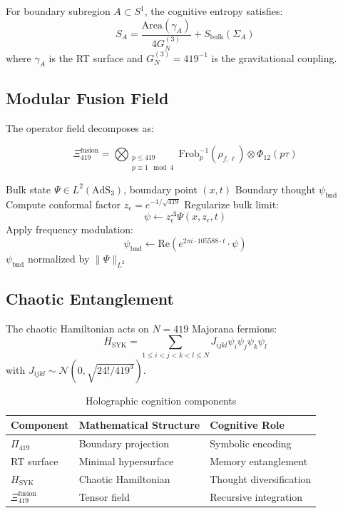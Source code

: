 \documentclass[12pt]{article}
\begin{document}
\begin{theorem}
For boundary subregion $A\subset S^1$, the cognitive entropy satisfies:
\[
S_A = \frac{\text{Area}(\gamma_A)}{4G_N^{(3)}} + S_{\text{bulk}}(\Sigma_A)
\]
where $\gamma_A$ is the RT surface and $G_N^{(3)}=419^{-1}$ is the gravitational coupling.
\end{theorem}

\subsection{Modular Fusion Field}
The operator field decomposes as:

\begin{equation}
\Xi_{419}^{\text{fusion}} = \bigotimes_{\substack{p\leq419 \\ p\equiv1\mod4}} \text{Frob}_p^{-1}(\rho_{f,\ell})\otimes\Phi_{12}(p\tau)
\end{equation}

\begin{algorithm}[H]
\caption{AdS-CFT Cognitive Projection}
\begin{algorithmic}[1]
\Require Bulk state $\Psi\in L^2(\text{AdS}_3)$, boundary point $(x,t)$
\Ensure Boundary thought $\psi_{\text{bnd}}$
\State Compute conformal factor $z_{\epsilon}=e^{-1/\sqrt{419}}$
\State Regularize bulk limit:
\[
\psi \gets z_{\epsilon}^{\Delta}\Psi(x,z_{\epsilon},t)
\]
\State Apply frequency modulation:
\[
\psi_{\text{bnd}} \gets \text{Re}(e^{2\pi i\cdot105588\cdot t}\cdot\psi)
\]
\State \Return $\psi_{\text{bnd}}$ normalized by $\|\Psi\|_{L^2}$
\end{algorithmic}
\end{algorithm}

\subsection{Chaotic Entanglement}
\begin{definition}
The chaotic Hamiltonian acts on $N=419$ Majorana fermions:
\[
H_{\text{SYK}} = \sum_{1\leq i<j<k<l\leq N} J_{ijkl}\psi_i\psi_j\psi_k\psi_l
\]
with $J_{ijkl}\sim\mathcal{N}(0,\sqrt{24!/419^3})$.
\end{definition}

\begin{table}[h]
\centering
\begin{tabular}{lll}
\toprule
\textbf{Component} & \textbf{Mathematical Structure} & \textbf{Cognitive Role} \\
\midrule
$\Pi_{419}$ & Boundary projection & Symbolic encoding \\
RT surface & Minimal hypersurface & Memory entanglement \\
$H_{\text{SYK}}$ & Chaotic Hamiltonian & Thought diversification \\
$\Xi_{419}^{\text{fusion}}$ & Tensor field & Recursive integration \\
\bottomrule
\end{tabular}
\caption{Holographic cognition components}
\end{table}
\end{document}
